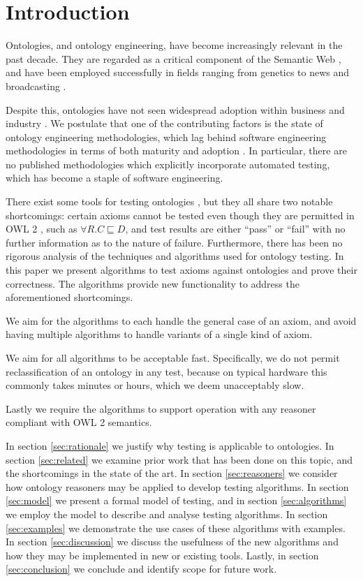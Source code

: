 \documentclass[paper.tex]{subfiles}
\begin{document}
\section{Introduction}
\label{sec:intro}

Ontologies, and ontology engineering, have become increasingly relevant in the past decade.
They are regarded as a critical component of the Semantic Web \cite{BernersLee:SemanticWeb}, and have been employed successfully in fields ranging from genetics \cite{GeneOntology:GoingForward} to news and broadcasting \cite{BBC:LinkedData}.

Despite this, ontologies have not seen widespread adoption within business and industry \cite{Kaczmarek:EnterpriseModelling}.
We postulate that one of the contributing factors is the state of ontology engineering methodologies, which lag behind software engineering methodologies in terms of both maturity and adoption \cite{Iqbal:Methodologies, Simperl:Maturity}.
In particular, there are no published methodologies which explicitly incorporate automated testing, which has become a staple of software engineering.

There exist some tools for testing ontologies \cite{Lawrynowicz:TDDontoTool, Warrender:HowWhatWhyTest, Scone:Bitbucket}, but they all share two notable shortcomings: certain axioms cannot be tested even though they are permitted in OWL 2 \cite{W3C:OWL2Syntax}, such as $\forall R.C \sqsubseteq D$, and test results are either ``pass'' or ``fail'' with no further information as to the nature of failure.
Furthermore, there has been no rigorous analysis of the techniques and algorithms used for ontology testing.
In this paper we present algorithms to test axioms against ontologies and prove their correctness.
The algorithms provide new functionality to address the aforementioned shortcomings.

We aim for the algorithms to each handle the general case of an axiom, and avoid having multiple algorithms to handle variants of a single kind of axiom.

We aim for all algorithms to be acceptable fast.
Specifically, we do not permit reclassification of an ontology in any test, because on typical hardware this commonly takes minutes or hours, which we deem unacceptably slow.

Lastly we require the algorithms to support operation with any reasoner compliant with OWL 2 semantics.

In section \ref{sec:rationale} we justify why testing is applicable to ontologies.
In section \ref{sec:related} we examine prior work that has been done on this topic, and the shortcomings in the state of the art.
In section \ref{sec:reasoners} we consider how ontology reasoners may be applied to develop testing algorithms.
In section \ref{sec:model} we present a formal model of testing, and in section \ref{sec:algorithms} we employ the model to describe and analyse testing algorithms.
In section \ref{sec:examples} we demonstrate the use cases of these algorithms with examples.
In section \ref{sec:discussion} we discuss the usefulness of the new algorithms and how they may be implemented in new or existing tools.
Lastly, in section \ref{sec:conclusion} we conclude and identify scope for future work.
\end{document}
